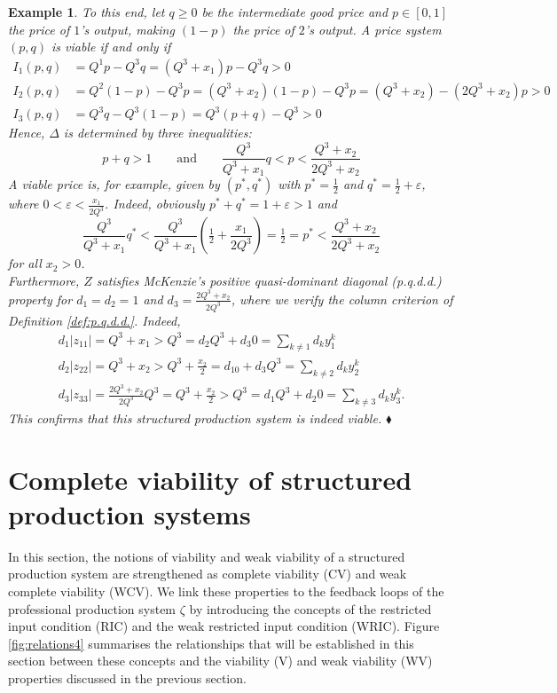 \documentclass[11pt,fleqn]{article}
\newtheorem{expl}[theorem]{Example}
\newenvironment{example}{\begin{expl} \rm}{\hfill $\blacklozenge$
\end{expl}}
\begin{document}
\begin{example}
	\noindent To this end, let $q \geqslant 0$ be the intermediate good price and $p \in [0,1]$ the price of $1$'s output, making $(1-p)$ the price of $2$'s output. A price system $(p,q)$ is viable if and only if
	\begin{align*}
	I_1 (p,q) & = Q^1p-Q^3q= (Q^3+x_1)p - Q^3q >0 \\
	I_2 (p,q) & = Q^2(1-p) -Q^3p = (Q^3+x_2)(1-p) -Q^3p = (Q^3+x_2) - (2Q^3+x_2)p >0\\
	I_3 (p,q) & = Q^3q- Q^3 (1-p) = Q^3(p+q)-Q^3 >0 
	\end{align*}
	Hence, $\Delta$ is determined by three inequalities:
	\[
	p+q >1 \qquad \mbox{and} \qquad \frac{Q^3}{Q^3+x_1}  q < p < \frac{Q^3+x_2}{2Q^3+x_2}
	\]
	A viable price is, for example, given by $(p^*,q^*)$ with $p^* = \tfrac{1}{2}$ and $q^* = \tfrac{1}{2} + \varepsilon$, where  $0< \varepsilon < \tfrac{x_1}{2Q^3}$. Indeed, obviously $p^*+q^*=1+ \varepsilon >1$ and
	\[
	\frac{Q^3}{Q^3+x_1} q^* < \frac{Q^3}{Q^3+x_1}  \left( \tfrac{1}{2} + \frac{x_1}{2Q^3} \right) = \tfrac{1}{2} = p^* < \frac{Q^3+x_2}{2Q^3+x_2}
	\]
	for all $x_2>0$. 
	\\
	Furthermore, $Z$ satisfies McKenzie's positive quasi-dominant diagonal (p.q.d.d.) property for $d_1=d_2=1$ and $d_3=\frac{2Q^3+x_2}{2Q^3}$, where we verify the column criterion of Definition \ref{def:p.q.d.d.}. Indeed,
	\begin{gather*}
	d_1|z_{11}| =Q^3+x_1>Q^3=d_2 Q^3+d_3 0=\sum_{k\neq 1} d_ky^k_1\\
	d_2|z_{22}| =Q^3+x_2>Q^3+\frac{x_2}{2}=d_10+d_3 Q^3=\sum_{k\neq 2} d_ky^k_2\\
	d_3|z_{33}| =\frac{2Q^3+x_2}{2Q^3}Q^3=Q^3+\frac{x_2}{2}>Q^3=d_1 Q^3+d_2 0=\sum_{k\neq 3} d_ky^k_3.
	\end{gather*}
	This confirms that this structured production system is indeed viable. 
\end{example}


\section{Complete viability of structured production systems}\label{sec: Complete Viability of structured production systems price systems}

 In this section, the notions of viability and weak viability of a structured production system are strengthened as complete viability (CV) and weak complete viability (WCV). We link these properties to the feedback loops of the professional production system $\zeta$ by introducing the concepts of the restricted input condition (RIC) and the weak restricted input condition (WRIC). Figure \ref{fig:relations4} summarises the relationships that will be established in this section between these concepts and the viability (V) and weak viability (WV) properties discussed in the previous section.
 
\end{document}
